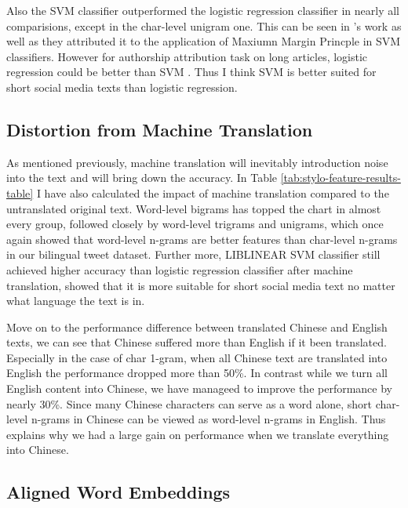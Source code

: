 \documentclass[11pt,a4paper]{article}
\begin{document}
Also the SVM classifier outperformed the logistic regression classifier in nearly all comparisions, except in the char-level unigram one. This can be seen in \citet{rocha2016authorship}'s work as well as they attributed it to the application of Maxiumn Margin Princple in SVM classifiers. However for authorship attribution task on long articles, logistic regression could be better than SVM \cite{bogdanova2014cross}. Thus I think SVM is better suited for short social media texts than logistic regression.

\subsection{Distortion from Machine Translation}

As mentioned previously, machine translation will inevitably introduction noise into the text and will bring down the accuracy. In Table \ref{tab:stylo-feature-results-table} I have also calculated the impact of machine translation compared to the untranslated original text. Word-level bigrams has topped the chart in almost every group, followed closely by word-level trigrams and unigrams, which once again showed that word-level n-grams are better features than char-level n-grams in our bilingual tweet dataset. Further more, LIBLINEAR SVM classifier still achieved higher accuracy than logistic regression classifier after machine translation, showed that it is more suitable for short social media text no matter what language the text is in.

Move on to the performance difference between translated Chinese and English texts, we can see that Chinese suffered more than English if it been translated. Especially in the case of char 1-gram, when all Chinese text are translated into English the performance dropped more than 50\%. In contrast while we turn all English content into Chinese, we have manageed to improve the performance by nearly 30\%. Since many Chinese characters can serve as a word alone, short char-level n-grams in Chinese can be viewed as word-level n-grams in English. Thus explains why we had a large gain on performance when we translate everything into Chinese.

\subsection{Aligned Word Embeddings}
\end{document}

